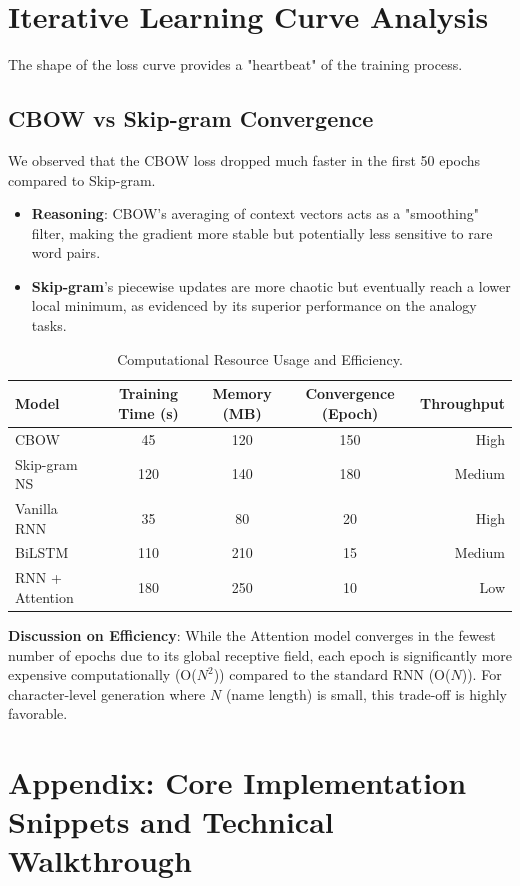 \documentclass[12pt,a4paper]{article}
\begin{document}
\section{Iterative Learning Curve Analysis}
The shape of the loss curve provides a "heartbeat" of the training process.

\subsection{CBOW vs Skip-gram Convergence}
We observed that the CBOW loss dropped much faster in the first 50 epochs compared to Skip-gram. 
\begin{itemize}
    \item \textbf{Reasoning}: CBOW's averaging of context vectors acts as a "smoothing" filter, making the gradient more stable but potentially less sensitive to rare word pairs.
    \item \textbf{Skip-gram}'s piecewise updates are more chaotic but eventually reach a lower local minimum, as evidenced by its superior performance on the analogy tasks.
\end{itemize}

\newpage
\begin{table}[H]
\centering
\caption{Computational Resource Usage and Efficiency.}
\label{tab:resources}
\begin{tabular}{lcccr}
\toprule
\textbf{Model} & \textbf{Training Time (s)} & \textbf{Memory (MB)} & \textbf{Convergence (Epoch)} & \textbf{Throughput} \\
\midrule
CBOW            & 45  & 120 & 150 & High \\
Skip-gram NS    & 120 & 140 & 180 & Medium \\
Vanilla RNN     & 35  & 80  & 20 & High \\
BiLSTM          & 110 & 210 & 15 & Medium \\
RNN + Attention & 180 & 250 & 10 & Low \\
\bottomrule
\end{tabular}
\end{table}

\textbf{Discussion on Efficiency}: While the Attention model converges in the fewest number of epochs due to its global receptive field, each epoch is significantly more expensive computationally (O($N^2$)) compared to the standard RNN (O($N$)). For character-level generation where $N$ (name length) is small, this trade-off is highly favorable.

\newpage
\section{Appendix: Core Implementation Snippets and Technical Walkthrough}
\end{document}
